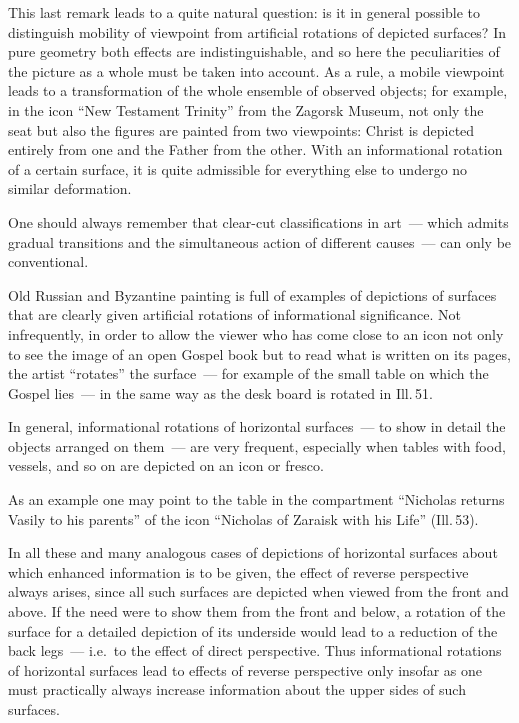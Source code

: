 
This last remark leads to a quite natural question: is it in general possible to
distinguish mobility of viewpoint from artificial rotations of depicted surfaces?  In
pure geometry both effects are indistinguishable, and so here the peculiarities of
the picture as a whole must be taken into account.  As a rule, a mobile viewpoint
leads to a transformation of the whole ensemble of observed objects; for example, in
the icon ``New Testament Trinity'' from the Zagorsk Museum, not only the seat but
also the figures are painted from two viewpoints: Christ is depicted entirely from
one and the Father from the other.  With an informational rotation of a certain
surface, it is quite admissible for everything else to undergo no similar deformation.

One should always remember that clear-cut classifications in art~--- which admits
gradual transitions and the simultaneous action of different causes~--- can only be
conventional.

Old Russian and Byzantine painting is full of examples of depictions of surfaces that
are clearly given artificial rotations of informational significance.  Not
infrequently, in order to allow the viewer who has come close to an icon not only to
see the image of an open Gospel book but to read what is written on its pages, the
artist ``rotates'' the surface~--- for example of the small table on which the Gospel
lies~--- in the same way as the desk board is rotated in Ill.\,51.

In general, informational rotations of horizontal surfaces~--- to show in detail the
objects arranged on them~--- are very frequent, especially when tables with food,
vessels, and so on are depicted on an icon or fresco.


As an example one may point to the table in the compartment ``Nicholas returns Vasily
to his parents'' of the icon ``Nicholas of Zaraisk with his Life'' (Ill.\,53).

In all these and many analogous cases of depictions of horizontal surfaces about which
enhanced information is to be given, the effect of reverse perspective always arises,
since all such surfaces are depicted when viewed from the front and above.  If the
need were to show them from the front and below, a rotation of the surface for a
detailed depiction of its underside would lead to a reduction of the back legs~--- i.e.\
to the effect of direct perspective.  Thus informational rotations of horizontal
surfaces lead to effects of reverse perspective only insofar as one must practically
always increase information about the upper sides of such surfaces.

